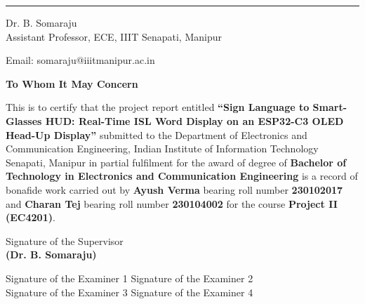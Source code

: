 \documentclass[12pt,a4paper]{report}
\newcommand{\reporttitle}{Sign Language to Smart-Glasses HUD: Real-Time ISL Word Display on an ESP32-C3 OLED Head-Up Display}
\begin{document}
\vspace{0.2cm}
\noindent\rule{\textwidth}{0.4pt}

\noindent
{\small
\begin{minipage}[t]{0.6\textwidth}
  Dr. B. Somaraju\\
  Assistant Professor, ECE, IIIT Senapati, Manipur
\end{minipage}%
\begin{minipage}[t]{0.4\textwidth}
  \raggedleft
  Email: somaraju@iiitmanipur.ac.in
\end{minipage}}

\vspace{0.8cm}
\begin{center}
{\Large\bfseries To Whom It May Concern}
\end{center}

\vspace{0.4cm}
\begin{center}
This is to certify that the project report entitled \textbf{``\reporttitle''} submitted to the Department of Electronics and Communication Engineering, Indian Institute of Information Technology Senapati, Manipur in partial fulfilment for the award of degree of \textbf{Bachelor of Technology in Electronics and Communication Engineering} is a record of bonafide work carried out by \textbf{Ayush Verma} bearing roll number \textbf{230102017} and \textbf{Charan Tej} bearing roll number \textbf{230104002} for the course \textbf{Project II (EC4201)}.
\end{center}

\vspace{1.2cm}
\begin{flushright}
\begin{minipage}{0.5\textwidth}
\centering
Signature of the Supervisor\\[6pt]
\textbf{(Dr. B. Somaraju)}
\end{minipage}
\end{flushright}

\vspace{1.2cm}
{\small
\noindent Signature of the Examiner 1 \dotfill\hspace{1em}Signature of the Examiner 2 \dotfill\\[1.2cm]
\noindent Signature of the Examiner 3 \dotfill\hspace{1em}Signature of the Examiner 4 \dotfill}

\end{document}
